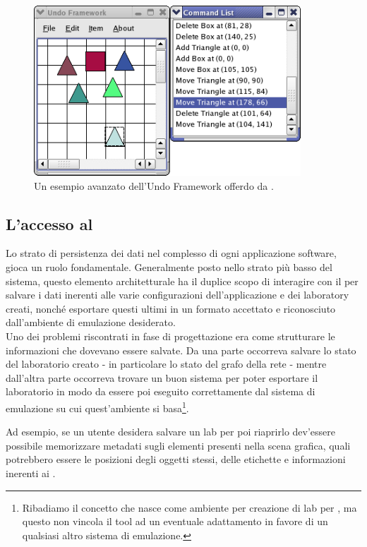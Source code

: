 \begin{figure}[!htb]
	\centering
	\includegraphics[width=10cm]{images/undoframeworkexample.png}
	\caption{Un esempio avanzato dell'Undo Framework offerdo da \qt{}.}
	\label{figura:qt_undo}
\end{figure}

\subsection{L'accesso al \fs{}}
Lo strato di persistenza dei dati nel complesso di ogni applicazione software, gioca un ruolo fondamentale. Generalmente posto nello strato più basso del sistema, questo elemento architetturale ha il duplice scopo di interagire con il \fs{} per salvare i dati inerenti alle varie configurazioni dell'applicazione e dei laboratory creati, nonché esportare questi ultimi in un formato accettato e riconosciuto dall'ambiente di emulazione desiderato.\\
Uno dei problemi riscontrati in fase di progettazione era come strutturare le informazioni che dovevano essere salvate. Da una parte occorreva salvare lo stato del laboratorio creato - in particolare lo stato del grafo della rete - mentre dall'altra parte occorreva trovare un buon sistema per poter esportare il laboratorio in modo da essere poi eseguito correttamente dal sistema di emulazione su cui quest'ambiente si basa\footnote{Ribadiamo il concetto che \visualnetkit{} nasce come ambiente per creazione di lab per \netkit{}, ma questo non vincola il tool ad un eventuale adattamento in favore di un qualsiasi altro sistema di emulazione.}.

Ad esempio, se un utente desidera salvare un lab per poi riaprirlo dev'essere possibile memorizzare metadati sugli elementi presenti nella scena grafica, quali potrebbero essere le posizioni degli oggetti stessi, delle etichette e informazioni inerenti ai \plugin{}.

